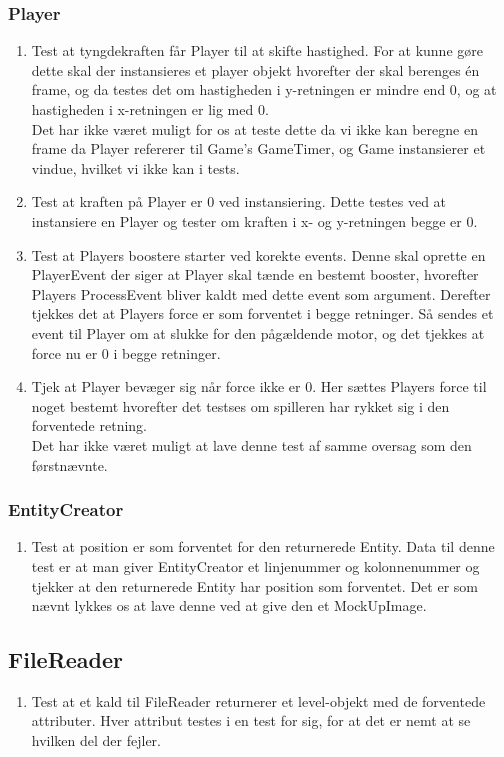    \subsubsection{Player}
      \begin{enumerate}
         \item Test at tyngdekraften får Player til at skifte hastighed. For at kunne gøre dette skal der instansieres et player objekt hvorefter der skal berenges én frame, og da testes det om hastigheden i y-retningen er mindre end 0, og at hastigheden i x-retningen er lig med 0.\\
         Det har ikke været muligt for os at teste dette da vi ikke kan beregne en frame da Player refererer til Game's GameTimer, og Game instansierer et vindue, hvilket vi ikke kan i tests.
         \item Test at kraften på Player er 0 ved instansiering. Dette testes ved at instansiere en Player og tester om kraften i x- og y-retningen begge er 0.
         \item Test at Players boostere starter ved korekte events. Denne skal oprette en PlayerEvent der siger at Player skal tænde en bestemt booster, hvorefter Players ProcessEvent bliver kaldt med dette event som argument. Derefter tjekkes det at Players force er som forventet i begge retninger. Så sendes et event til Player om at slukke for den pågældende motor, og det tjekkes at force nu er 0 i begge retninger.
         \item Tjek at Player bevæger sig når force ikke er 0. Her sættes Players force til noget bestemt hvorefter det testses om spilleren har rykket sig i den forventede retning. \\
         Det har ikke været muligt at lave denne test af samme oversag som den førstnævnte.       
      \end{enumerate}
   \subsubsection{EntityCreator}
      \begin{enumerate}
         \item Test at position er som forventet for den returnerede Entity. Data til denne test er at man giver EntityCreator et linjenummer og kolonnenummer og tjekker at den returnerede Entity har position som forventet. Det er som nævnt lykkes os at lave denne ved at give den et MockUpImage. 
      \end{enumerate}
   \subsection{FileReader}
      \begin{enumerate}
         \item Test at et kald til FileReader returnerer et level-objekt med de forventede attributer. Hver attribut testes i en test for sig, for at det er nemt at se hvilken del der fejler.
      \end{enumerate}
